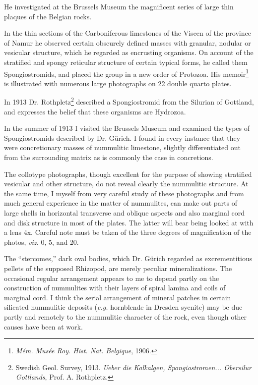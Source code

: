 \documentclass[a4paper, 12pt, oneside]{article}
\begin{document}
He investigated at the Brussels Museum the magnificent series of large thin plaques of the Belgian rocks.

In the thin sections of the Carboniferous limestones of the Viseen of the province of Namur he observed certain obscurely defined masses with granular, nodular or vesicular structure, which he regarded as encrusting organisms. On account of the stratified and spongy reticular structure of certain typical forms, he called them Spongiostromids, and placed the group in a new order of Protozoa. His memoir\footnote{\emph{Mém. Musée Roy. Hist. Nat. Belgique}, 1906.} is illustrated with numerous large photographs on 22 double quarto plates.

In 1913 Dr. Rothpletz\footnote{Swedish Geol. Survey, 1913. \emph{Ueber die Kalkalgen, Spongiostromen... Obersilur Gottlands}, Prof. A. Rothpletz.} described a Spongiostromid from the Silurian of Gottland, and expresses the belief that these organisms are Hydrozoa.

In the summer of 1913 I visited the Brussels Museum and examined the types of Spongiostromids described by Dr. Gürich. I found in every instance that they were concretionary masses of nummulitic limestone, slightly differentiated out from the surrounding matrix as is commonly the case in concretions.

The collotype photographs, though excellent for the purpose of showing stratified vesicular and other structure, do not reveal clearly the nummulitic structure. At the same time, I myself from very careful study of these photographs and from much general experience in the matter of nummulites, can make out parts of large shells in horizontal transverse and oblique aspects and also marginal cord and disk structure in most of the plates. The latter will bear being looked at with a lens 4x. Careful note must be taken of the three degrees of magnification of the photos, \emph{viz.} 0, 5, and 20.

The ``stercomes,'' dark oval bodies, which Dr. Gürich regarded as excrementitious pellets of the supposed Rhizopod, are merely peculiar mineralizations. The occasional regular arrangement appears to me to depend partly on the construction of nummulites with their layers of spiral lamina and coils of marginal cord. I think the serial arrangement of mineral patches in certain silicated nummulitic deposits (\emph{e.g.} hornblende in Dresden syenite) may be due partly and remotely to the nummulitic character of the rock, even though other causes have been at work.
\end{document}
